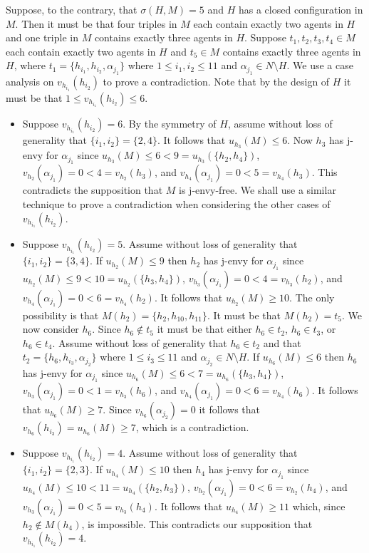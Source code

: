Suppose, to the contrary, that $\sigma(H, M) = 5$ and $H$ has a closed configuration in $M$. Then it must be that four triples in $M$ each contain exactly two agents in $H$ and one triple in $M$ contains exactly three agents in $H$. Suppose $t_1, t_2, t_3, t_4 \in M$ each contain exactly two agents in $H$ and $t_5 \in M$ contains exactly three agents in $H$, where $t_1 = \{ h_{i_1}, h_{i_2}, \alpha_{j_1} \}$ where $1\leq i_1, i_2 \leq 11$ and $\alpha_{j_1} \in N \setminus H$. We use a case analysis on $v_{h_{i_1}}(h_{i_2})$ to prove a contradiction. Note that by the design of $H$ it must be that $1 \leq v_{h_{i_1}}(h_{i_2}) \leq 6$.
\begin{itemize}
    \item Suppose $v_{h_{i_1}}(h_{i_2}) = 6$. By the symmetry of $H$, assume without loss of generality that $\{ i_1, i_2 \} = \{ 2, 4 \}$. It follows that $u_{h_3}(M) \leq 6$. Now $h_3$ has j-envy for $\alpha_{j_1}$ since $u_{h_3}(M) \leq 6 < 9 = u_{h_3}(\{ h_2, h_4 \})$, $v_{h_2}(\alpha_{j_1}) = 0 < 4 = v_{h_2}(h_3)$, and $v_{h_4}(\alpha_{j_1}) = 0 < 5 = v_{h_4}(h_3)$. This contradicts the supposition that $M$ is j-envy-free. We shall use a similar technique to prove a contradiction when considering the other cases of $v_{h_{i_1}}(h_{i_2})$.
    \item Suppose $v_{h_{i_1}}(h_{i_2}) = 5$. Assume without loss of generality that $\{ i_1, i_2 \} = \{ 3, 4 \}$. If $u_{h_2}(M) \leq 9$ then $h_2$ has j-envy for $\alpha_{j_1}$ since $u_{h_2}(M) \leq 9 < 10 = u_{h_2}(\{ h_3, h_4 \})$, $v_{h_3}(\alpha_{j_1}) = 0 < 4 = v_{h_3}(h_2)$, and $v_{h_4}(\alpha_{j_1}) = 0 < 6 = v_{h_4}(h_2)$. It follows that $u_{h_2}(M) \geq 10$. The only possibility is that $M(h_2) = \{ h_2, h_{10}, h_{11} \}$. It must be that $M(h_2) = t_5$. We now consider $h_6$. Since $h_6 \notin t_5$ it must be that either $h_6 \in t_2$, $h_6 \in t_3$, or $h_6 \in t_4$. Assume without loss of generality that $h_6 \in t_2$ and that $t_2 = \{ h_6, h_{i_3}, \alpha_{j_2} \}$ where $1\leq i_3 \leq 11$ and $\alpha_{j_2} \in N \setminus H$. If $u_{h_6}(M) \leq 6$ then $h_6$ has j-envy for $\alpha_{j_1}$ since $u_{h_6}(M) \leq 6 < 7 = u_{h_6}(\{ h_3, h_4 \})$, $v_{h_3}(\alpha_{j_1}) = 0 < 1 = v_{h_3}(h_6)$, and $v_{h_4}(\alpha_{j_1}) = 0 < 6 = v_{h_4}(h_6)$. It follows that $u_{h_6}(M) \geq 7$.  Since $v_{h_6}(\alpha_{j_2})=0$ it follows that $v_{h_6}(h_{i_3}) = u_{h_6}(M) \geq 7$, which is a contradiction.
    \item Suppose $v_{h_{i_1}}(h_{i_2}) = 4$. Assume without loss of generality that $\{ i_1, i_2 \} = \{ 2, 3 \}$. If $u_{h_4}(M) \leq 10$ then $h_4$ has j-envy for $\alpha_{j_1}$ since $u_{h_4}(M) \leq 10 < 11 = u_{h_4}(\{ h_2, h_3 \})$, $v_{h_2}(\alpha_{j_1}) = 0 < 6 = v_{h_2}(h_4)$, and $v_{h_3}(\alpha_{j_1}) = 0 < 5 = v_{h_3}(h_4)$. It follows that $u_{h_4}(M) \geq 11$ which, since $h_2 \notin M(h_4)$, is impossible. This contradicts our supposition that $v_{h_{i_1}}(h_{i_2}) = 4$.

\end{itemize}
